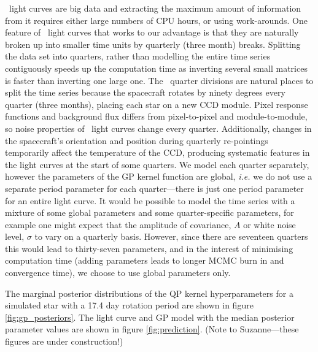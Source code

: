 \kepler\ light curves are big data and extracting the maximum amount of
information from it requires either large numbers of CPU hours, or using
work-arounds.
One feature of \kepler\ light curves that works to our advantage is that they
are naturally broken up into smaller time units by quarterly (three month)
breaks.
Splitting the data set into quarters, rather than modelling the entire time
series contiguously speeds up the computation time as inverting several
small matrices is faster than inverting one large one.
The \kepler\ quarter divisions are natural places to split the time series
because the spacecraft rotates by ninety degrees every quarter (three months),
placing each star on a new CCD module.
Pixel response functions and background flux differs from pixel-to-pixel and
module-to-module, so noise properties of \kepler\ light curves change every
quarter.
Additionally, changes in the spacecraft's orientation and position during
quarterly re-pointings temporarily affect the temperature of the CCD,
producing systematic features in the light curves at the start of some
quarters.
We model each quarter separately, however the parameters of the GP kernel
function are global, {\it i.e.} we do not use a separate period parameter for
each quarter---there is just one period parameter for an entire light curve.
It would be possible to model the time series with a mixture of some global
parameters and some quarter-specific parameters, for example one might expect
that the amplitude of covariance, $A$ or white noise level, $\sigma$ to vary
on a quarterly basis.
However, since there are seventeen quarters this would lead to thirty-seven
parameters, and in the interest of minimising computation time (adding
parameters leads to longer MCMC burn in and convergence time), we choose to
use global parameters only.

The marginal posterior distributions of the QP kernel hyperparameters for a
simulated star with a 17.4 day rotation period are shown in figure
\ref{fig:gp_posteriors}.
The light curve and GP model with the median posterior parameter values are
shown in figure \ref{fig:prediction}.
(Note to Suzanne---these figures are under construction!)


